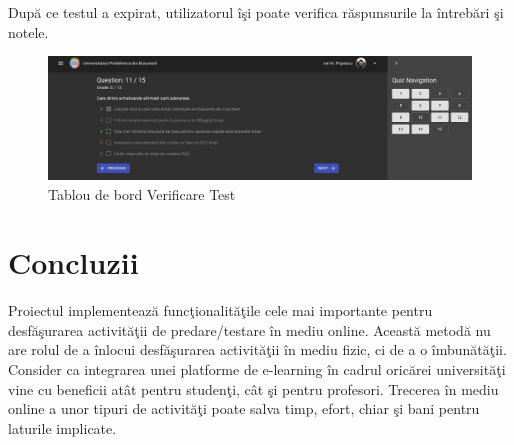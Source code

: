 \documentclass[12pt, a4paper, oneside, romanian]{teza-upb}
\begin{document}
După ce testul a expirat, utilizatorul îşi poate verifica răspunsurile la întrebări şi notele.

\begin{figure}[H]
\centering
\includegraphics*[width=\columnwidth]{tablou-de-bord-verificare-test}
\caption{Tablou de bord Verificare Test}
\label{tablou-de-bord-verificare-test}
\end{figure}




\chapter*{Concluzii}

Proiectul implementează funcţionalităţile cele mai importante pentru desfăşurarea activităţii de predare/testare în mediu online. Această metodă nu are rolul de a înlocui desfăşurarea activităţii în mediu fizic, ci de a o îmbunătăţii. Consider ca integrarea unei platforme de e-learning în cadrul oricărei universităţi vine cu beneficii atât pentru studenţi, cât şi pentru profesori. Trecerea în mediu online a unor tipuri de activităţi poate salva timp, efort, chiar şi bani pentru laturile implicate.





\end{document}
